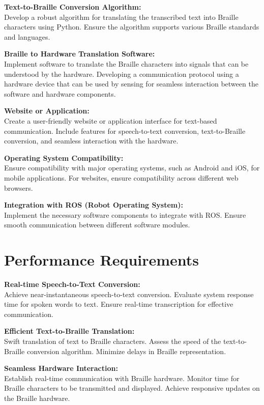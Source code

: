 \documentclass[12pt,a4paper]{report}
\begin{document}
\noindent\textbf{Text-to-Braille Conversion Algorithm:}\\
Develop a robust algorithm for translating the transcribed text into Braille characters using Python. Ensure the algorithm supports various Braille standards and languages.

\noindent\textbf{Braille to Hardware Translation Software:}\\
Implement software to translate the Braille characters into signals that can be understood by the hardware. Developing a communication protocol using a hardware device that can be used by sensing for seamless interaction between the software and hardware components.

\noindent\textbf{Website or Application:}\\
Create a user-friendly website or application interface for text-based communication. Include features for speech-to-text conversion, text-to-Braille conversion, and seamless interaction with the hardware.

\noindent\textbf{Operating System Compatibility:}\\
Ensure compatibility with major operating systems, such as Android and iOS, for mobile applications. For websites, ensure compatibility across different web browsers.

\noindent\textbf{Integration with ROS (Robot Operating System):}\\
Implement the necessary software components to integrate with ROS. Ensure smooth communication between different software modules.


\section{Performance Requirements }
\textbf{Real-time Speech-to-Text Conversion:}\\
Achieve near-instantaneous speech-to-text conversion. Evaluate system response time for spoken words to text. Ensure real-time transcription for effective communication.

\noindent\textbf{Efficient Text-to-Braille Translation:}\\
Swift translation of text to Braille characters. Assess the speed of the text-to-Braille conversion algorithm. Minimize delays in Braille representation.

\noindent\textbf{Seamless Hardware Interaction:}\\
Establish real-time communication with Braille hardware. Monitor time for Braille characters to be transmitted and displayed. Achieve responsive updates on the Braille hardware.
\end{document}
